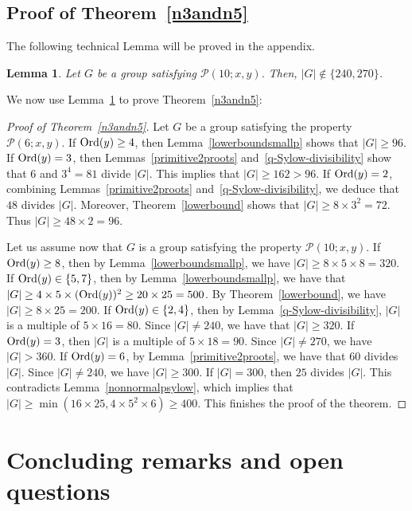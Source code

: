 \documentclass[12pt]{amsart}
\numberwithin{equation}{section}
\newcommand{\Ord}{{\rm Ord}}
\newtheorem{lem}[X]{Lemma}
\theoremstyle{definition}
\theoremstyle{remark}
\begin{document}
\subsection{Proof of Theorem~\ref{n3andn5}}
The following technical Lemma will be proved in the appendix. 
\begin{lem}\label{P(10)-generalcase}
        Let $G$ be a group satisfying $\mathcal{P}(10;x,y)$. Then, $|G|\notin\{240,270\}$.
\end{lem}
We now use Lemma~\ref{P(10)-generalcase} to prove Theorem~\ref{n3andn5}:
\begin{proof}[Proof of Theorem~\ref{n3andn5}]
        Let $G$ be a group satisfying the property $\mathcal{P}(6;x,y)$. If $\Ord(y)\ge 4$, then Lemma~\ref{lowerboundsmallp} shows that $|G|\ge 96$. If $\Ord(y)=3$, then Lemmas~\ref{primitive2proots} and~\ref{q-Sylow-divisibility} show that $6$ and $3^4=81$ divide $|G|$. This implies that $|G|\ge 162>96$. If $\Ord(y)=2$, combining Lemmas~\ref{primitive2proots} and~\ref{q-Sylow-divisibility}, we deduce that $48$ divides $|G|$. Moreover, Theorem~\ref{lowerbound} shows that $|G|\ge 8\times 3^2=72$. Thus $|G|\ge 48\times 2=96$.
        
        Let us assume now that $G$ is a group satisfying the property $\mathcal{P}(10;x,y)$. If $\Ord(y)\ge 8$, then by Lemma~\ref{lowerboundsmallp}, we have $|G|\ge 8\times 5\times 8=320$. If $\Ord(y)\in \{5,7\}$, then by Lemma~\ref{lowerboundsmallp}, we have that $|G|\ge 4\times 5\times (\Ord(y))^2\ge 20\times 25=500$. By Theorem~\ref{lowerbound}, we have $|G|\ge 8\times 25=200$. If $\Ord(y)\in\{2,4\}$, then by Lemma~\ref{q-Sylow-divisibility}, $|G|$ is a multiple of $5\times 16=80$. Since $|G|\ne 240$, we have that $|G|\ge 320$. If $\Ord(y)=3$, then $|G|$ is a multiple of $5\times 18=90$. Since $|G|\ne 270$, we have $|G|>360$. If $\Ord(y)=6$, by Lemma~\ref{primitive2proots}, we have that $60$ divides $|G|$. Since $|G|\ne 240$, we have $|G|\ge 300$. If $|G|=300$, then $25$ divides $|G|$. This contradicts Lemma~\ref{nonnormalpsylow}, which implies that $|G|\ge \min (16\times 25, 4\times 5^2 \times 6)\ge 400$. This finishes the proof of the theorem.
\end{proof}



\section{Concluding remarks and open questions}\label{sec:open_questions}
\end{document}
